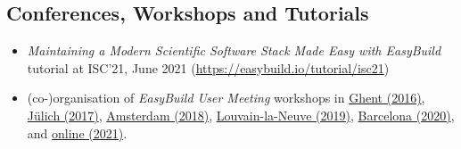 \subsection*{Conferences, Workshops and Tutorials}

\begin{itemize}

\item[] \emph{Maintaining a Modern Scientific Software Stack Made Easy with EasyBuild} tutorial at ISC'21, June 2021 (\url{https://easybuild.io/tutorial/isc21})
\item[] (co-)organisation of \emph{EasyBuild User Meeting} workshops in
    \href{https://github.com/easybuilders/easybuild/wiki/1st-EasyBuild-User-Meeting}{Ghent (2016)},
        \href{https://github.com/easybuilders/easybuild/wiki/2nd-EasyBuild-User-Meeting}{J\"ulich (2017)},
        \href{https://github.com/easybuilders/easybuild/wiki/3rd-EasyBuild-User-Meeting}{Amsterdam (2018)},
        \href{https://github.com/easybuilders/easybuild/wiki/4th-EasyBuild-User-Meeting}{Louvain-la-Neuve (2019)},
        \href{https://github.com/easybuilders/easybuild/wiki/5th-EasyBuild-User-Meeting}{Barcelona (2020)},
        and \href{https://easybuild.io/eum21}{online (2021)}.


\end{itemize}
